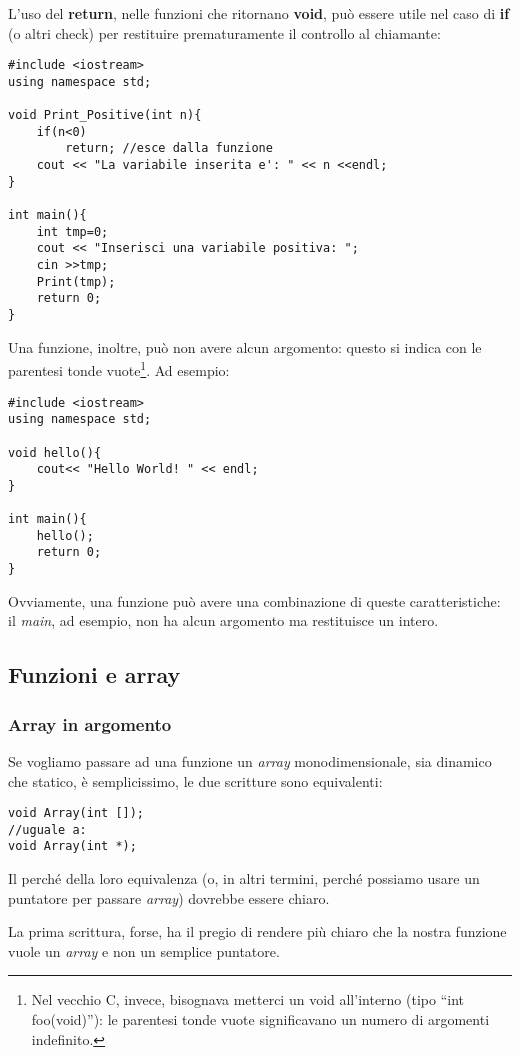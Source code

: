L'uso del \textbf{return}, nelle funzioni che ritornano \textbf{void}, può essere utile nel caso di \textbf{if} (o altri check) per restituire prematuramente il controllo al chiamante:
\begin{lstlisting}
#include <iostream>
using namespace std;

void Print_Positive(int n){
	if(n<0)
		return; //esce dalla funzione
	cout << "La variabile inserita e': " << n <<endl;
}

int main(){
	int tmp=0;
	cout << "Inserisci una variabile positiva: ";
	cin >>tmp;
	Print(tmp);
	return 0;
}
\end{lstlisting}

Una funzione, inoltre, può non avere alcun argomento: questo si indica con le parentesi tonde vuote\footnote{Nel vecchio C, invece, bisognava metterci un void all'interno (tipo ``int foo(void)''): le parentesi tonde vuote significavano un numero di argomenti indefinito.}. Ad esempio:

\begin{lstlisting}
#include <iostream>
using namespace std;

void hello(){
	cout<< "Hello World! " << endl;
}

int main(){
	hello();
	return 0;
}
\end{lstlisting}

Ovviamente, una funzione può avere una combinazione di queste caratteristiche: il \emph{main}, ad esempio, non ha alcun argomento ma restituisce un intero.

\subsection{Funzioni e array}
\subsubsection{Array in argomento} Se vogliamo passare ad una funzione un \emph{array} monodimensionale, sia dinamico che statico, è semplicissimo, le due scritture sono equivalenti:

\begin{lstlisting}
void Array(int []);
//uguale a:
void Array(int *);
\end{lstlisting}

Il perché della loro equivalenza (o, in altri termini, perché possiamo usare un puntatore per passare \emph{array}) dovrebbe essere chiaro.

La prima scrittura, forse, ha il pregio di rendere più chiaro che la nostra funzione vuole un \emph{array} e non un semplice puntatore.

